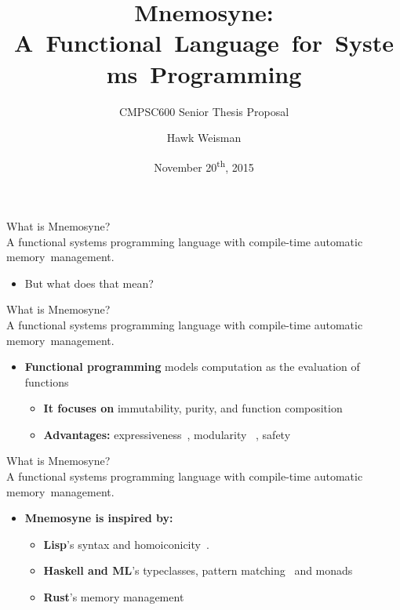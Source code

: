 \documentclass{beamer}
\title[Mnemosyne]{Mnemosyne: A~Functional~Language~for~Systems~Programming}
\subtitle{CMPSC600 Senior Thesis Proposal}
\author[Hawk Weisman]{Hawk Weisman}
\institute[Allegheny College]{Department of Computer Science \\ Allegheny College}
\date{November 20\textsuperscript{th}, 2015}
\begin{document}
\maketitle

\begin{frame}
\alert{\huge{What is Mnemosyne?}}\\
\large{A functional systems programming language with compile-time automatic memory~management.} \normalsize
\begin{itemize}
    \item But what does that mean?
\end{itemize}
\end{frame}

\begin{frame}
\alert{\huge{What is Mnemosyne?}}\\
\large{A \alert<1->{functional} systems programming language with compile-time automatic memory~management.} \normalsize
\begin{itemize}
\item<2->
\textbf{Functional programming} models computation as the evaluation of functions~\cite{Wise:2003:FP:1074100.1074416,hughes1989functional}
\begin{itemize}
    \item<2-> \textbf{It focuses on} immutability, purity, and function composition
    \item<3> \textbf{Advantages:} expressiveness~\cite{hughes1989functional,hudak1994haskell}, modularity %
    ~\cite{hughes1989functional,hudak1994haskell}, safety
    \end{itemize}
\end{itemize}
\end{frame}

\begin{frame}
\alert{\huge{What is Mnemosyne?}}\\
\large{A \alert<1->{functional} systems programming language with compile-time automatic memory~management.}\normalsize
\begin{itemize}
\item
\textbf{Mnemosyne is inspired by:}
    \begin{itemize}
        \item\textbf{Lisp}'s syntax and homoiconicity~\cite{vanderhart2010macros,sicp}.
        \item\textbf{Haskell and ML}'s typeclasses, pattern matching~\cite{maranget2007warnings,Krishnaswami:2009:FPM:1594834.1480927} and monads~\cite{jones2003haskell,hudak1992gentle,hudak1992report}
        \item\textbf{Rust}'s memory management~\cite{whyrust,whyrust}
    \end{itemize}

\end{itemize}
\end{frame}
\end{document}
